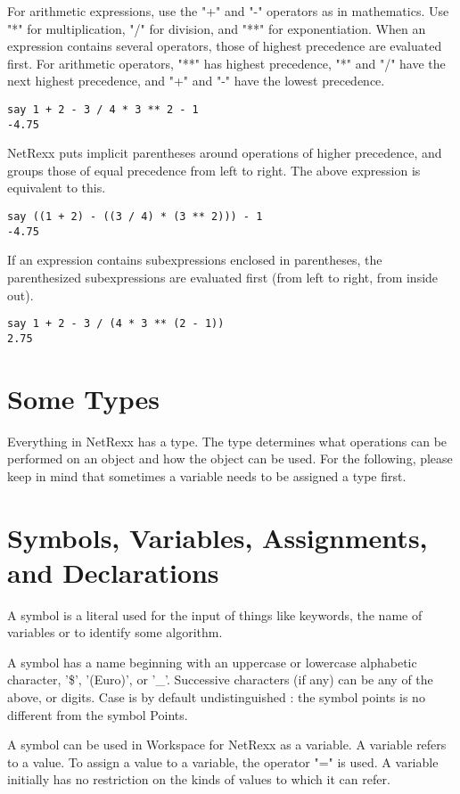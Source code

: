 For arithmetic expressions, use the "+" and "-" operators as in mathematics. Use "*" for multiplication, "/" for division, and "**" for exponentiation. When an expression contains several operators, those of highest precedence are evaluated first. For arithmetic operators, "**" has highest precedence, "*" and "/" have the next highest precedence, and "+" and "-" have the lowest precedence.
\begin{verbatim}
say 1 + 2 - 3 / 4 * 3 ** 2 - 1
-4.75
\end{verbatim}
NetRexx puts implicit parentheses around operations of higher precedence, and groups those of equal precedence from left to right. The above expression is equivalent to this.

\begin{verbatim}
say ((1 + 2) - ((3 / 4) * (3 ** 2))) - 1
-4.75
\end{verbatim}
If an expression contains subexpressions enclosed in parentheses, the parenthesized subexpressions are evaluated first (from left to right, from inside out).

\begin{verbatim}
say 1 + 2 - 3 / (4 * 3 ** (2 - 1))
2.75
\end{verbatim}
\section{Some Types}

Everything in NetRexx has a type. The type determines what operations
can be performed on an object and how the object can be used. For the
following, please keep in mind that sometimes a variable needs to be
assigned a type first.


\section{Symbols, Variables, Assignments, and Declarations}

A symbol is a literal used for the input of things like keywords, the name of variables or to identify some algorithm.

A symbol has a name beginning with an uppercase or lowercase alphabetic character, '\$', '(Euro)', or '\_'. Successive characters (if any) can be any of the above, or digits. Case is by default undistinguished : the symbol points is no different from the symbol Points.

A symbol can be used in Workspace for NetRexx as a variable. A variable refers to a value. To assign a value to a variable, the operator "=" is used. A variable initially has no restriction on the kinds of values to which it can refer.

